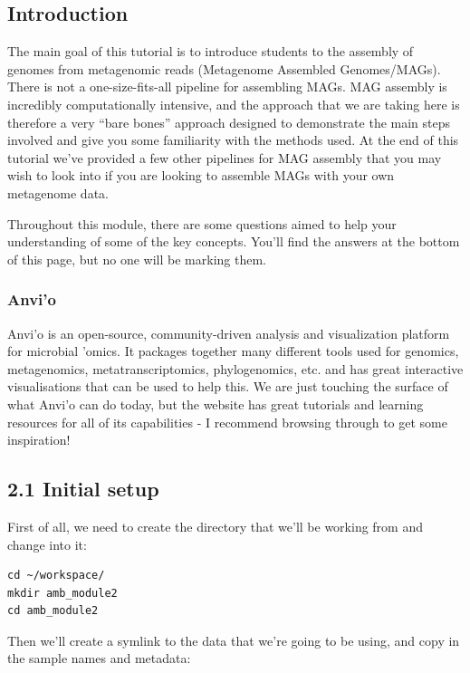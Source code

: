 \documentclass[
]{book}
\begin{document}
\subsection{Introduction}\label{introduction}

The main goal of this tutorial is to introduce students to the assembly of genomes from metagenomic reads (Metagenome Assembled Genomes/MAGs). There is not a one-size-fits-all pipeline for assembling MAGs. MAG assembly is incredibly computationally intensive, and the approach that we are taking here is therefore a very ``bare bones'' approach designed to demonstrate the main steps involved and give you some familiarity with the methods used. At the end of this tutorial we've provided a few other pipelines for MAG assembly that you may wish to look into if you are looking to assemble MAGs with your own metagenome data.

Throughout this module, there are some questions aimed to help your understanding of some of the key concepts. You'll find the answers at the bottom of this page, but no one will be marking them.

\subsubsection{Anvi'o}\label{anvio}

Anvi'o is an open-source, community-driven analysis and visualization platform for microbial 'omics. It packages together many different tools used for genomics, metagenomics, metatranscriptomics, phylogenomics, etc. and has great interactive visualisations that can be used to help this. We are just touching the surface of what Anvi'o can do today, but the website has great tutorials and learning resources for all of its capabilities - I recommend browsing through to get some inspiration!

\subsection{2.1 Initial setup}\label{initial-setup}

First of all, we need to create the directory that we'll be working from and change into it:

\begin{verbatim}
cd ~/workspace/
mkdir amb_module2
cd amb_module2
\end{verbatim}

Then we'll create a symlink to the data that we're going to be using, and copy in the sample names and metadata:
\end{document}
